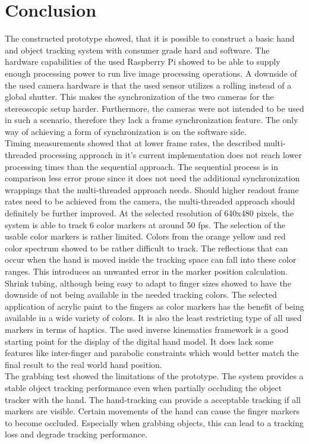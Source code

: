 \chapter{Conclusion}
The constructed prototype showed, that it is possible to construct a basic hand and object tracking system with consumer grade hard and software. The hardware capabilities of the used Raspberry Pi showed to be able to supply enough processing power to run live image processing operations. A downside of the used camera hardware is that the used sensor utilizes a rolling instead of a global shutter. This makes the synchronization of the two cameras for the stereoscopic setup harder. Furthermore, the cameras were not intended to be used in such a scenario, therefore they lack a frame synchronization feature. The only way of achieving a form of synchronization is on the software side.\\
Timing measurements showed that at lower frame rates, the described multi-threaded processing approach in it's current implementation does not reach lower processing times than the sequential approach. The sequential process is in comparison less error prone since it does not need the additional synchronization wrappings that the multi-threaded approach needs. Should higher readout frame rates  need to be achieved from the camera, the multi-threaded approach should definitely be further improved. At the selected resolution of 640x480 pixels, the system is able to track 6 color markers at around 50 fps.
The selection of the usable color markers is rather limited. Colors from the orange yellow and red color spectrum showed to be rather difficult to track. The reflections that can occur when the hand is moved inside the tracking space can fall into these color ranges. This introduces an unwanted error in the marker position calculation.
Shrink tubing, although being easy to adapt to finger sizes showed to have the downside of not being available in the needed tracking colors. The selected application of acrylic paint to the fingers as color markers has the benefit of being available in a wide variety of colors. It is also the least restricting type of all used markers in terms of haptics.
The used inverse kinematics framework is a good starting point for the display of the digital hand model. It does lack some features like inter-finger and parabolic constraints which would better match the final result to the real world hand position.\\
The grabbing test showed the limitations of the prototype. The system provides a stable object tracking performance even when partially occluding the object tracker with the hand. The hand-tracking can provide a acceptable tracking if all markers are visible. Certain movements of the hand can cause the finger markers to become occluded. Especially when grabbing objects, this can lead to a tracking loss and degrade tracking performance.

